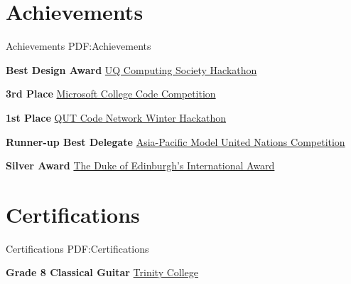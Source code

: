 \documentclass[a4paper,10pt,oneside]{article}
\begin{document}
\begin{minipage}[t][0pt]{\linewidth}
\begin{body}
\section
{Achievements}
{Achievements}
{PDF:Achievements}

\par \textbf{Best Design Award}
\href{https://uqcs.org.au/}{UQ Computing Society Hackathon}
\hfill {}

\par \textbf{3rd Place}
\href{https://msft3c.com/}{Microsoft College Code Competition}
\hfill {}

\par \textbf{1st Place}
\href{https://codenetwork.co/hackathon-2017/}{QUT Code Network Winter Hackathon}
\hfill {}

\par \textbf{Runner-up Best Delegate}
\href{http://www.amunc.net/}{Asia-Pacific Model United Nations Competition} 
\hfill {}

\par \textbf{Silver Award}
\href{http://www.dukeofed.com.au/}{The Duke of Edinburgh’s International Award}
\hfill {}

\section
{Certifications}
{Certifications}
{PDF:Certifications}





\textbf{Grade 8 Classical Guitar}
\href{http://www.trinitycollege.com/}{Trinity College}
\hfill {}



\end{body}
\end{minipage}
\end{document}
